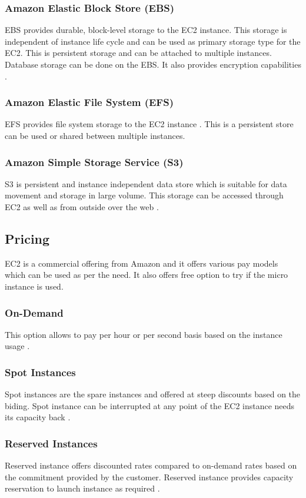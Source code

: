 \subsubsection{Amazon Elastic Block Store (EBS)} 
EBS provides durable, block-level storage to the EC2 instance. This storage is independent of instance life cycle and can be used as primary storage type for the EC2. This is persistent storage and can be attached to multiple instances. Database storage can be done on the EBS. It also provides encryption capabilities \cite{www-aws-ec2Storage}.
\subsubsection{Amazon Elastic File System (EFS)} 
EFS provides file system storage to the EC2 instance \cite{www-aws-ec2Storage}. This is a persistent store can be used or shared between multiple instances.
\subsubsection{Amazon Simple Storage Service (S3)} 
S3 is persistent and instance independent data store which is suitable for data movement and storage in large volume. This storage can be accessed through EC2 as well as from outside over the web \cite{www-aws-ec2Storage}. 

\subsection{Pricing}
EC2 is a commercial offering from Amazon and it offers various pay models which can be used as per the need. It also offers free option to try if the micro instance is used.
\subsubsection{On-Demand} 
This option allows to pay per hour or per second basis based on the instance usage \cite{www-aws-ec2Pricing}.
\subsubsection{Spot Instances} 
Spot instances are the spare instances and offered at steep discounts based on the biding. Spot instance can be interrupted at any point of the EC2 instance needs its capacity back \cite{www-aws-ec2Pricing}.
\subsubsection{Reserved Instances} 
Reserved instance offers discounted rates compared to on-demand rates based on the commitment provided by the customer. Reserved instance provides capacity reservation to launch instance as required \cite{www-aws-ec2Pricing}.
